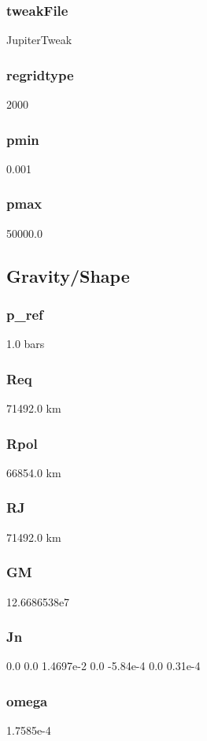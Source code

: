 \documentclass[11pt]{article}
\begin{document}
\subsubsection{tweakFile}
JupiterTweak

\subsubsection{regridtype}
2000

\subsubsection{pmin}
0.001

\subsubsection{pmax}
50000.0

\subsection{Gravity/Shape}
\subsubsection{p\_ref}
1.0      bars

\subsubsection{Req}
      71492.0  km

\subsubsection{Rpol}
     66854.0  km

\subsubsection{RJ}
       71492.0  km

\subsubsection{GM}
       12.6686538e7

\subsubsection{Jn}
       0.0 0.0 1.4697e-2 0.0 -5.84e-4 0.0 0.31e-4

\subsubsection{omega}
    1.7585e-4
\end{document}
